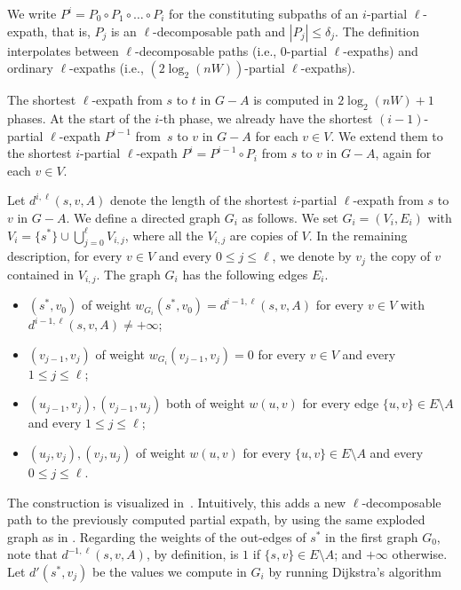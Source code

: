 \documentclass{theoretics}
\renewcommand{\leq}{\leqslant}
\renewcommand{\le}{\leqslant}
\begin{document}
We write $P^{i} = P_0 \circ P_1 \circ \ldots \circ P_i$ for the constituting subpaths 
of an $i$-partial $\ell$-expath, that is, $P_j$ is an $\ell$-decomposable path and $|P_j| \le \delta_j$.
The definition interpolates between $\ell$-decomposable paths (i.e., $0$-partial $\ell$-expaths) 
and ordinary $\ell$-expaths (i.e., $(2 \log_2(nW))$-partial $\ell$-expaths).

The shortest $\ell$-expath from $s$ to $t$ in $G - A$ is computed in $2\log_2(nW)+1$ phases.
At the start of the $i$-th phase, we already have the shortest $(i{-}1)$-partial $\ell$-expath 
$P^{i-1}$ from~$s$ to $v$ in $G - A$ for each $v \in V$.
We extend them to the shortest $i$-partial $\ell$-expath 
$P^i = P^{i-1} \circ  P_{i}$ from $s$ to $v$ in $G - A$, again for each $v \in V$. 

Let $d^{i,\ell}(s,v,A)$ denote the length of the shortest $i$-partial $\ell$-expath from $s$ to $v$ in $G{-}A$. We define a directed graph $G_i$ as follows. We set $G_i= (V_i, E_i)$ with $V_i = \{s^*\} \cup \bigcup_{j=0}^{\ell}{V_{i,j}}$, where all the $V_{i,j}$ are copies of $V$.
In the remaining description, for every $v \in V$ and every $0 \leq j \leq \ell$, we denote by $v_{j}$ the copy of $v$ contained in $V_{i,j}$. 
The graph $G_i$ has the following edges $E_i$.
\begin{itemize}
    \item $(s^*,v_{0})$ of weight $w_{G_i}(s^*,v_{0}) = d^{i-1,\ell}(s,v,A)$
    	for every $v \in V$ with $d^{i-1,\ell}(s,v,A) \neq +\infty$;
    \item $(v_{j-1},v_{j})$ of weight $w_{G_i}(v_{j-1},v_{j}) = 0$
    	for every $v \in V$ and every $1 \leq j \leq \ell$;
    \item $(u_{j-1},v_j),(v_{j-1},u_j)$ both of weight $w(u,v)$
    	for every edge $\{u,v\} \in E{\setminus}A$ and every $1 \leq j \leq \ell$;
    \item $(u_{j},v_{j}), (v_j,u_j)$ of weight $w(u,v)$
    	for every \mbox{$\{u,v\} \in E{\setminus}A$} and every $0 \leq j \leq \ell$.
\end{itemize}
The construction is visualized in~. 
Intuitively, this adds a new $\ell$-decomposable path to the previously computed partial expath, by using the same exploded graph as in .
Regarding the weights of the out-edges of $s^*$ in the first graph $G_0$,
note that $d^{-1,\ell}(s,v,A)$, by definition, is $1$ if $\{s,v\} \in E{\setminus}A$;
and $+\infty$ otherwise.
Let $d'(s^*,v_j)$ be the values we compute in $G_i$ by running Dijkstra's algorithm
\end{document}
